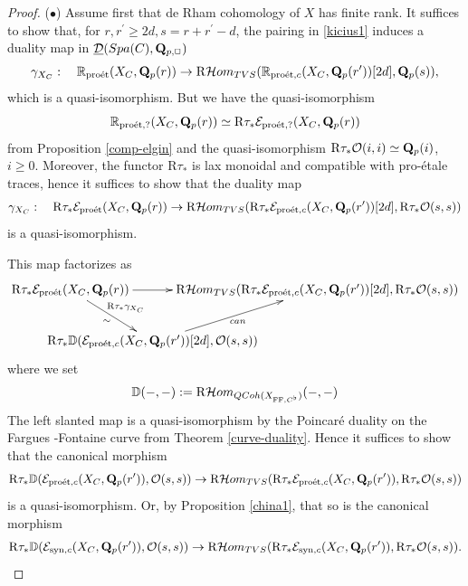 \documentclass[10pt,reqno]{amsart}
\let\cal\mathcal
\theoremstyle{definition}
\theoremstyle{remark}
\newcommand{\proeet}{\operatorname{pro\acute{e}t} }
\newcommand{\Hhom}{{\cal Hom}}
\newcommand{\synt}{ \operatorname{syn} }
\newcommand{\FF}{\operatorname{FF} }
\newcommand{\so}{{\mathcal O}}
\newcommand{\se}{{\mathcal{E}}}
\newcommand{\sd}{{\mathcal{D}}}
\numberwithin{equation}{section}
\def\R{{\mathrm R}}
\def\Q{{\bf Q}} \def\Z{{\bf Z}}
\def\bD{${\mathbb D}$}
\numberwithin{equation}{section}
\begin{document}
\begin{proof} 
($\bullet$)  Assume first that de Rham cohomology of $X$ has finite rank. It suffices to show that, for $r,r^{\prime}\geq 2d, s=r+r^{\prime}-d$,  the  pairing in \eqref{kicius1}  induces a duality map in 
 $\underline{\sd}({\rm Spa}(C),\Q_{p,\Box})$
$$
\gamma_{X_C}:\quad {\mathbb R}_{\proeet}(X_C,\Q_p(r))\to \R\Hhom_{\rm TVS}({\mathbb R}_{\proeet,c}(X_C,\Q_p(r^{\prime}))[2d],{\Q}_p(s)),
$$
which is a quasi-isomorphism. 
 But we have  the quasi-isomorphism  
$${\mathbb R}_{\proeet,?}(X_C,\Q_p(r))\simeq \R\tau_{*}\se_{\proeet,?}(X_C,\Q_p(r)) $$ 
from  Proposition \ref{comp-elgin} and the quasi-isomorphism $\R\tau_*\so(i,i)\simeq \Q_p(i)$, $i\geq 0$.
 Moreover, the functor $\R\tau_*$ is lax monoidal and compatible with pro-\'etale traces, hence it suffices 
 to show that the duality map 
$$
\gamma_{X_C}:\quad \R\tau_*\se_{\proeet}(X_C,\Q_p(r))\to \R\Hhom_{\rm TVS}(\R\tau_*\se_{\proeet,c}(X_C,\Q_p(r^{\prime}))[2d],\R\tau_*\so(s,s))
$$
is a quasi-isomorphism. 

   This map factorizes as 
$$
\xymatrix@C=-2.5cm{
 \R\tau_*\se_{\proeet}(X_C,\Q_p(r))\ar[rr] \ar[rd]^-{\R\tau_*\gamma_{X_C}}_{\sim}&  &\R\Hhom_{\rm TVS}(\R\tau_*\se_{\proeet,c}(X_C,\Q_p(r^{\prime}))[2d],\R\tau_*\so(s,s))\\
 & \R\tau_*{\mathbb D}(\se_{\proeet,c}(X_C,\Q_p(r^{\prime}))[2d],\so(s,s))\ar[ur]_-{\rm can}
}
$$
where we \index{D@\bD}set 
$${\mathbb D}(-,-):=\R\Hhom_{\rm QCoh(X_{\FF,C^{\flat}})}(-, -)$$
 The left slanted map is a quasi-isomorphism by the Poincar\'e duality on the Fargues -Fontaine curve from 
 Theorem \ref{curve-duality}. 
Hence it suffices to show that the canonical morphism
$$
 \R\tau_{*}{\mathbb D}(\se_{\proeet,c}(X_C,\Q_p(r^{\prime})),\so(s,s))\to \R\Hhom_{\rm TVS}(\R\tau_*\se_{\proeet,c}(X_C,\Q_p(r^{\prime})),\R\tau_*\so(s,s))
$$
is a quasi-isomorphism. Or, by Proposition \ref{china1}, that  so is the canonical morphism
$$
 \R\tau_{*}{\mathbb D}(\se_{\synt,c}(X_C,\Q_p(r^{\prime})),\so(s,s))\to \R\Hhom_{\rm TVS}(\R\tau_*\se_{\synt,c}(X_C,\Q_p(r^{\prime})),\R\tau_*\so(s,s)).
$$


\end{proof}
\end{document}
